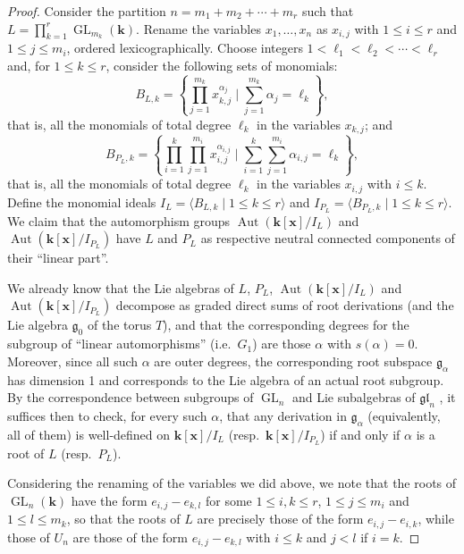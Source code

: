 \documentclass[11pt,letterpaper,reqno]{amsart}
\theoremstyle{remark}
\theoremstyle{definition}
\def\XX{\mathbf{x}}
\newcommand{\KK}[0]{\ensuremath{\mathbf{k}}}
\newcommand{\Aut}[0]{\ensuremath{\operatorname{Aut}}}
\newcommand{\GL}[0]{\ensuremath{\operatorname{GL}}}
\begin{document}
\begin{proof}
Consider the partition $n=m_1+m_2+\cdots+m_r$ such that $L=\prod_{k=1}^r\GL_{m_k}(\KK)$. Rename the variables $x_1,\ldots,x_n$ as $x_{i,j}$ with $1\leq i\leq r$ and $1\leq j\leq m_i$, ordered lexicographically. Choose integers $1<\ell_1<\ell_2<\cdots<\ell_r$ and, for $1\leq k\leq r$, consider the following sets of monomials:
$$B_{L,k}=\left\{\prod_{j=1}^{m_k}x_{k,j}^{\alpha_j}\mid \sum_{j=1}^{m_k}\alpha_j=\ell_k\right\},$$
that is, all the monomials of total degree $\ell_k$ in the variables $x_{k,j}$; and
$$B_{P_L,k}=\left\{\prod_{i=1}^{k}\prod_{j=1}^{m_i}x_{i,j}^{\alpha_{i,j}}\mid \sum_{i=1}^k\sum_{j=1}^{m_i}\alpha_{i,j}=\ell_k\right\},$$
that is, all the monomials of total degree $\ell_k$ in the variables $x_{i,j}$ with $i\leq k$. Define the monomial ideals $I_{L}=\langle B_{L,k}\mid 1\leq k\leq r\rangle$ and $I_{P_L}=\langle B_{P_L,k}\mid 1\leq k\leq r\rangle$. We claim that the automorphism groups $\Aut(\KK[\XX]/I_L)$ and $\Aut(\KK[\XX]/I_{P_L})$ have $L$ and $P_L$ as respective neutral connected components of their ``linear part''.

We already know that the Lie algebras of $L$, $P_L$, $\Aut(\KK[\XX]/I_L)$ and $\Aut(\KK[\XX]/I_{P_L})$ decompose as graded direct sums of root derivations (and the Lie algebra $\mathfrak{g}_0$ of the torus $T$), and that the corresponding degrees for the subgroup of ``linear automorphisms'' (i.e.~$G_1$) are those $\alpha$ with $s(\alpha)=0$. Moreover, since all such $\alpha$ are outer degrees, the corresponding root subspace $\mathfrak{g}_\alpha$ has dimension 1 and corresponds to the Lie algebra of an actual root subgroup. By the correspondence between subgroups of $\GL_n$ and Lie subalgebras of $\mathfrak{gl}_n$ \cite[Section~13.1, Theorem]{Humphreys}, it suffices then to check, for every such $\alpha$, that any derivation in $\mathfrak{g}_\alpha$ (equivalently, all of them) is well-defined on $\KK[\XX]/I_L$ (resp.~$\KK[\XX]/I_{P_L}$) if and only if $\alpha$ is a root of $L$ (resp.~$P_L$). 

Considering the renaming of the variables we did above, we note that the roots of $\GL_n(\KK)$ have the form $e_{i,j}-e_{k,l}$ for some $1\leq i,k\leq r$, $1\leq j\leq m_i$ and $1\leq l\leq m_k$, so that the roots of $L$ are precisely those of the form $e_{i,j}-e_{i,k}$, while those of $U_n$ are those of the form $e_{i,j}-e_{k,l}$ with $i\leq k$ and $j<l$ if $i=k$.


\end{proof}
\end{document}
